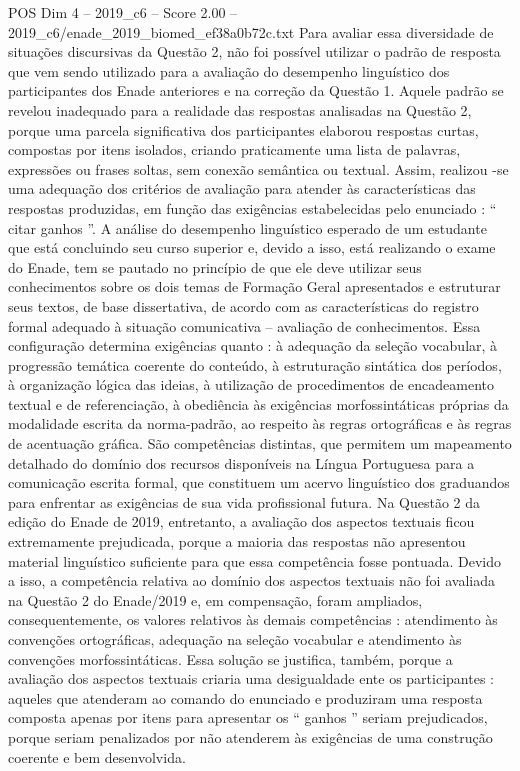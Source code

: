 \begin{textsample}{POS Dim 4 – 2019\_c6 – Score 2.00 – 2019\_c6/enade\_2019\_biomed\_ef38a0b72c.txt}
Para avaliar essa diversidade de situações discursivas da Questão 2, não foi possível utilizar o padrão de resposta que vem sendo utilizado para a avaliação do desempenho linguístico dos participantes dos Enade anteriores e na correção da Questão 1.
Aquele padrão se revelou inadequado para a realidade das respostas analisadas na Questão 2, porque uma parcela significativa dos participantes elaborou respostas curtas, compostas por itens isolados, criando praticamente uma lista de palavras, expressões ou frases soltas, sem conexão semântica ou textual.
Assim, realizou -se uma adequação dos critérios de avaliação para atender às características das respostas produzidas, em função das exigências estabelecidas pelo enunciado : “ citar ganhos ”.
A análise do desempenho linguístico esperado de um estudante que está concluindo seu curso superior e, devido a isso, está realizando o exame do Enade, tem se pautado no princípio de que ele deve utilizar seus conhecimentos sobre os dois temas de Formação Geral apresentados e estruturar seus textos, de base dissertativa, de acordo com as características do registro formal adequado à situação comunicativa – avaliação de conhecimentos.
Essa configuração determina exigências quanto : à adequação da seleção vocabular, à progressão temática coerente do conteúdo, à estruturação sintática dos períodos, à organização lógica das ideias, à utilização de procedimentos de encadeamento textual e de referenciação, à obediência às exigências morfossintáticas próprias da modalidade escrita da norma-padrão, ao respeito às regras ortográficas e às regras de acentuação gráfica.
São competências distintas, que permitem um mapeamento detalhado do domínio dos recursos disponíveis na Língua Portuguesa para a comunicação escrita formal, que constituem um acervo linguístico dos graduandos para enfrentar as exigências de sua vida profissional futura.
Na Questão 2 da edição do Enade de 2019, entretanto, a avaliação dos aspectos textuais ficou extremamente prejudicada, porque a maioria das respostas não apresentou material linguístico suficiente para que essa competência fosse pontuada.
Devido a isso, a competência relativa ao domínio dos aspectos textuais não foi avaliada na Questão 2 do Enade/2019 e, em compensação, foram ampliados, consequentemente, os valores relativos às demais competências : atendimento às convenções ortográficas, adequação na seleção vocabular e atendimento às convenções morfossintáticas.
Essa solução se justifica, também, porque a avaliação dos aspectos textuais criaria uma desigualdade ente os participantes : aqueles que atenderam ao comando do enunciado e produziram uma resposta composta apenas por itens para apresentar os “ ganhos ” seriam prejudicados, porque seriam penalizados por não atenderem às exigências de uma construção coerente e bem desenvolvida.

\end{textsample}
